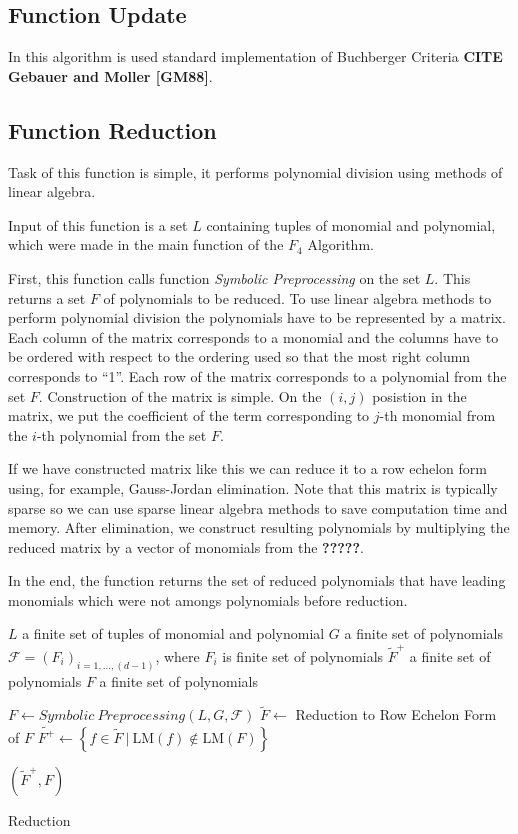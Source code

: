 \subsection{Function Update}
In this algorithm is used standard implementation of Buchberger Criteria \textbf{CITE Gebauer and Moller [GM88]}.

\subsection{Function Reduction}
Task of this function is simple, it performs polynomial division using methods of linear algebra.

Input of this function is a set $L$ containing tuples of monomial and polynomial, which were made in the main function of the $F_4$ Algorithm.

First, this function calls function \textit{Symbolic Preprocessing} on the set $L$. This returns a set $F$ of polynomials to be reduced. To use linear algebra methods to perform polynomial division the polynomials have to be represented by a matrix. Each column of the matrix corresponds to a monomial and the columns have to be ordered with respect to the ordering used so that the most right column corresponds to ``1''. Each row of the matrix corresponds to a polynomial from the set $F$. Construction of the matrix is simple. On the $(i, j)$ posistion in the matrix, we put the coefficient of the term corresponding to $j$-th monomial from the $i$-th polynomial from the set $F$.

If we have constructed matrix like this we can reduce it to a row echelon form using, for example, Gauss-Jordan elimination. Note that this matrix is typically sparse so we can use sparse linear algebra methods to save computation time and memory. After elimination, we construct resulting polynomials by multiplying the reduced matrix by a vector of monomials from the \textbf{?????}.

In the end, the function returns the set of reduced polynomials that have leading monomials which were not amongs polynomials before reduction.

\begin{algorithm}[ht]
  \begin{algorithmic}[1]
    \Require
      \Statex $L$ a finite set of tuples of monomial and polynomial
      \Statex $G$ a finite set of polynomials
      \Statex $\mathcal{F} = (F_i)_{i=1,\ldots,(d-1)}$, where $F_i$ is finite set of polynomials
    \Ensure
      \Statex $\tilde{F}^+$ a finite set of polynomials
      \Statex $F$ a finite set of polynomials
      \Statex

    \State $F \gets Symbolic\ Preprocessing(L, G, \mathcal{F})$
    \State $\tilde{F} \gets$ Reduction to Row Echelon Form of $F$
    \State $\tilde{F^+} \gets \left\{f \in \tilde{F}\ |\ \textrm{LM}(f) \notin \textrm{LM}(F)\right\}$

    \State \Return $(\tilde{F}^+, F)$

  \end{algorithmic}
  \caption{Reduction}
\end{algorithm}


